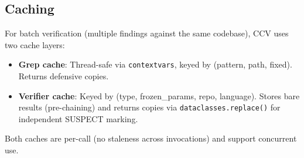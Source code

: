 \subsection{Caching}

For batch verification (multiple findings against the same codebase), CCV uses two cache layers:

\begin{itemize}
    \item \textbf{Grep cache}: Thread-safe via \texttt{contextvars}, keyed by (pattern, path, fixed). Returns defensive copies.
    \item \textbf{Verifier cache}: Keyed by (type, frozen\_params, repo, language). Stores bare results (pre-chaining) and returns copies via \texttt{dataclasses.replace()} for independent SUSPECT marking.
\end{itemize}

Both caches are per-call (no staleness across invocations) and support concurrent use.
